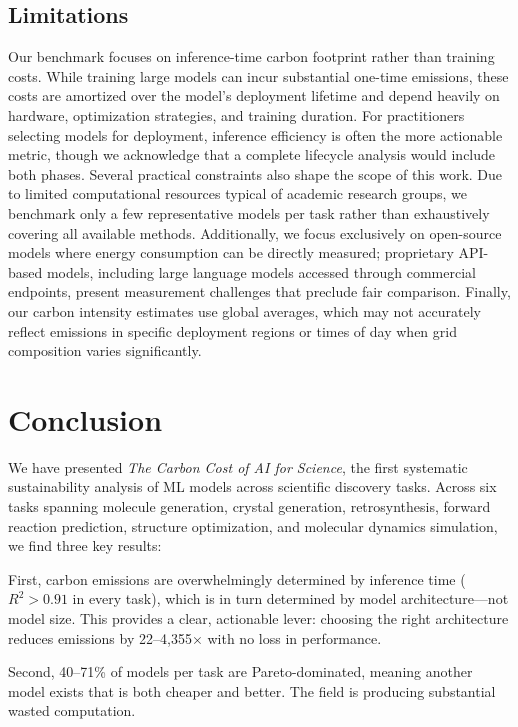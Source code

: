 \documentclass{article}
\theoremstyle{plain}
\theoremstyle{definition}
\theoremstyle{remark}
\begin{document}
\subsection{Limitations}
Our benchmark focuses on inference-time carbon footprint rather than training costs. While training large models can incur substantial one-time emissions, these costs are amortized over the model's deployment lifetime and depend heavily on hardware, optimization strategies, and training duration. For practitioners selecting models for deployment, inference efficiency is often the more actionable metric, though we acknowledge that a complete lifecycle analysis would include both phases.
Several practical constraints also shape the scope of this work. Due to limited computational resources typical of academic research groups, we benchmark only a few representative models per task rather than exhaustively covering all available methods. Additionally, we focus exclusively on open-source models where energy consumption can be directly measured; proprietary API-based models, including large language models accessed through commercial endpoints, present measurement challenges that preclude fair comparison. Finally, our carbon intensity estimates use global averages, which may not accurately reflect emissions in specific deployment regions or times of day when grid composition varies significantly.

\section{Conclusion}
We have presented \textit{The Carbon Cost of AI for Science}, the first systematic sustainability analysis of ML models across scientific discovery tasks. Across six tasks spanning molecule generation, crystal generation, retrosynthesis, forward reaction prediction, structure optimization, and molecular dynamics simulation, we find three key results:

First, carbon emissions are overwhelmingly determined by inference time ($R^2 > 0.91$ in every task), which is in turn determined by model architecture---not model size. This provides a clear, actionable lever: choosing the right architecture reduces emissions by 22--4{,}355$\times$ with no loss in performance.

Second, 40--71\% of models per task are Pareto-dominated, meaning another model exists that is both cheaper and better. The field is producing substantial wasted computation.
\end{document}
